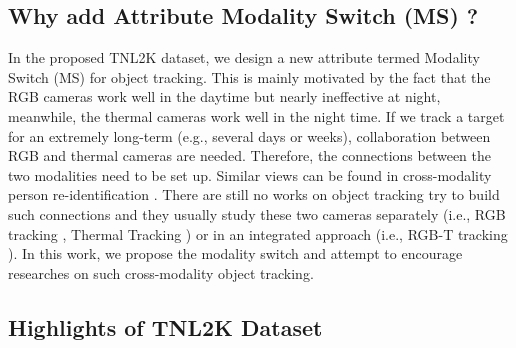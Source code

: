 \documentclass[final]{cvpr}
\begin{document}
\subsection{Why add Attribute Modality Switch (MS) ?} 
In the proposed TNL2K dataset, we design a new attribute termed Modality Switch (MS) for object tracking. This is mainly motivated by the fact that the RGB cameras work well in the daytime but nearly ineffective at night, meanwhile, the thermal cameras work well in the night time. If we track a target for an extremely long-term (e.g., several days or weeks), collaboration between RGB and thermal cameras are needed. Therefore, the connections between the two modalities need to be set up. Similar views can be found in cross-modality person re-identification \cite{wu2017rgbinfraredreid, wu2020rgbirreid}. There are still no works on object tracking try to build such connections and they usually study these two cameras separately (i.e., RGB tracking \cite{Wu2013Online, fan2019lasot, Wang_2018_CVPR}, Thermal Tracking \cite{liu2019ptbtracking}) or in an integrated approach (i.e., RGB-T tracking \cite{li2019rgbt234}). In this work, we propose the modality switch and attempt to encourage researches on such cross-modality object tracking. 




\subsection{Highlights of TNL2K Dataset} 


 
\end{document}
